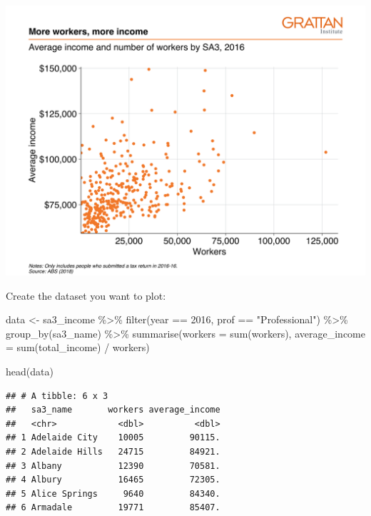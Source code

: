 \documentclass[
]{book}
\newenvironment{Shaded}{\begin{snugshade}}{\end{snugshade}}
\newcommand{\AttributeTok}[1]{\textcolor[rgb]{0.77,0.63,0.00}{#1}}
\newcommand{\DecValTok}[1]{\textcolor[rgb]{0.00,0.00,0.81}{#1}}
\newcommand{\FunctionTok}[1]{\textcolor[rgb]{0.00,0.00,0.00}{#1}}
\newcommand{\NormalTok}[1]{#1}
\newcommand{\OtherTok}[1]{\textcolor[rgb]{0.56,0.35,0.01}{#1}}
\newcommand{\SpecialCharTok}[1]{\textcolor[rgb]{0.00,0.00,0.00}{#1}}
\newcommand{\StringTok}[1]{\textcolor[rgb]{0.31,0.60,0.02}{#1}}
\begin{document}
\includegraphics[width=44.44in]{atlas/simple_scatter}

Create the dataset you want to plot:

\begin{Shaded}
\begin{Highlighting}[]
\NormalTok{data }\OtherTok{\textless{}{-}}\NormalTok{ sa3\_income }\SpecialCharTok{\%\textgreater{}\%} 
  \FunctionTok{filter}\NormalTok{(year }\SpecialCharTok{==} \DecValTok{2016}\NormalTok{,}
\NormalTok{         prof }\SpecialCharTok{==} \StringTok{"Professional"}\NormalTok{) }\SpecialCharTok{\%\textgreater{}\%} 
  \FunctionTok{group\_by}\NormalTok{(sa3\_name) }\SpecialCharTok{\%\textgreater{}\%} 
  \FunctionTok{summarise}\NormalTok{(}\AttributeTok{workers =} \FunctionTok{sum}\NormalTok{(workers),}
            \AttributeTok{average\_income =} \FunctionTok{sum}\NormalTok{(total\_income) }\SpecialCharTok{/}\NormalTok{ workers)}

\FunctionTok{head}\NormalTok{(data)}
\end{Highlighting}
\end{Shaded}

\begin{verbatim}
## # A tibble: 6 x 3
##   sa3_name       workers average_income
##   <chr>            <dbl>          <dbl>
## 1 Adelaide City    10005         90115.
## 2 Adelaide Hills   24715         84921.
## 3 Albany           12390         70581.
## 4 Albury           16465         72305.
## 5 Alice Springs     9640         84340.
## 6 Armadale         19771         85407.
\end{verbatim}
\end{document}
